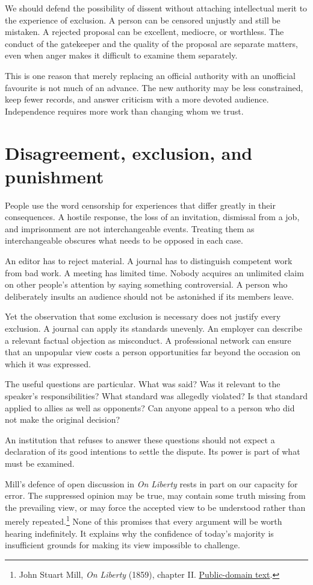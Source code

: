\documentclass[12pt,a4paper]{book}
\begin{document}
We should defend the possibility of dissent without attaching intellectual merit to the experience of exclusion. A person can be censored unjustly and still be mistaken. A rejected proposal can be excellent, mediocre, or worthless. The conduct of the gatekeeper and the quality of the proposal are separate matters, even when anger makes it difficult to examine them separately.

This is one reason that merely replacing an official authority with an unofficial favourite is not much of an advance. The new authority may be less constrained, keep fewer records, and answer criticism with a more devoted audience. Independence requires more work than changing whom we trust.

\section*{Disagreement, exclusion, and punishment}

People use the word censorship for experiences that differ greatly in their consequences. A hostile response, the loss of an invitation, dismissal from a job, and imprisonment are not interchangeable events. Treating them as interchangeable obscures what needs to be opposed in each case.

An editor has to reject material. A journal has to distinguish competent work from bad work. A meeting has limited time. Nobody acquires an unlimited claim on other people's attention by saying something controversial. A person who deliberately insults an audience should not be astonished if its members leave.

Yet the observation that some exclusion is necessary does not justify every exclusion. A journal can apply its standards unevenly. An employer can describe a relevant factual objection as misconduct. A professional network can ensure that an unpopular view costs a person opportunities far beyond the occasion on which it was expressed.

The useful questions are particular. What was said? Was it relevant to the speaker's responsibilities? What standard was allegedly violated? Is that standard applied to allies as well as opponents? Can anyone appeal to a person who did not make the original decision?

An institution that refuses to answer these questions should not expect a declaration of its good intentions to settle the dispute. Its power is part of what must be examined.

Mill's defence of open discussion in \emph{On Liberty} rests in part on our capacity for error. The suppressed opinion may be true, may contain some truth missing from the prevailing view, or may force the accepted view to be understood rather than merely repeated.\footnote{John Stuart Mill, \emph{On Liberty} (1859), chapter II. \href{https://www.gutenberg.org/files/34901/34901-h/34901-h.htm}{Public-domain text}.} None of this promises that every argument will be worth hearing indefinitely. It explains why the confidence of today's majority is insufficient grounds for making its view impossible to challenge.
\end{document}

